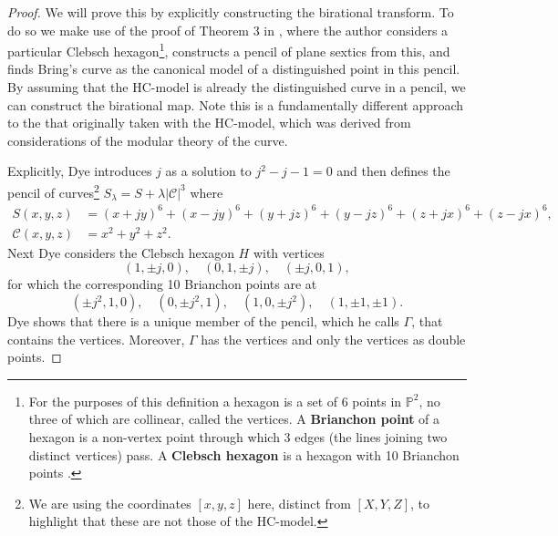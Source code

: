 \documentclass{amsart}
\newcommand{\bam}[1]{\textbf{#1}}
\begin{document}
\begin{proof}
We will prove this by explicitly constructing the birational transform.  To do so we make use of the proof of Theorem 3 in \cite{Dye1995}, where the author considers a particular Clebsch hexagon\footnote{For the purposes of this definition a hexagon is a set of 6 points in $\mathbb{P}^2$, no three of which are collinear, called the vertices. A \bam{Brianchon point} of a hexagon is a non-vertex point through which 3 edges (the lines joining two distinct vertices) pass. A \bam{Clebsch hexagon} is a hexagon with 10 Brianchon points \cite{Dye1991}.}, constructs a pencil of plane sextics from this, and finds Bring's curve as the canonical model of a distinguished point in this pencil. By assuming that the HC-model is already the distinguished curve in a pencil, we can construct the birational map. Note this is a fundamentally different approach to the that originally taken with the HC-model, which was derived from considerations of the modular theory of the curve.

Explicitly, Dye introduces $j$ as a solution to $j^2-j-1=0$ and then defines the pencil of curves\footnote{We are using the coordinates $[x,y,z]$ here, distinct from $[X,Y,Z]$,
to highlight that these are not those of the HC-model.} $S_\lambda = S+ \lambda \left \lvert \mathcal{C} \right \rvert^3$ where 
\begin{equation}\label{dyespencil}
\begin{split}
    S(x,y,z) &= (x+jy)^6+(x-jy)^6+(y+jz)^6+(y-jz)^6+(z+jx)^6+(z-jx)^6  , \\
    \mathcal{C}(x,y,z) &= x^2 + y^2 + z^2  .
\end{split}
\end{equation}
Next Dye considers the Clebsch hexagon $H$ with vertices
\[
(1, \pm j, 0)  , \quad (0, 1, \pm j)  , \quad (\pm j, 0, 1) ,
\]
for which the corresponding 10 Brianchon points are at 
\[
(\pm j^2, 1, 0)  , \quad (0, \pm j^2, 1)  , \quad (1, 0, \pm j^2)  , \quad (1, \pm 1, \pm 1).
\]
Dye shows that there is a unique member of the pencil, which he calls $\Gamma$, that contains the vertices. Moreover, $\Gamma$ has the vertices and only the vertices as double points. 


\end{proof}
\end{document}
